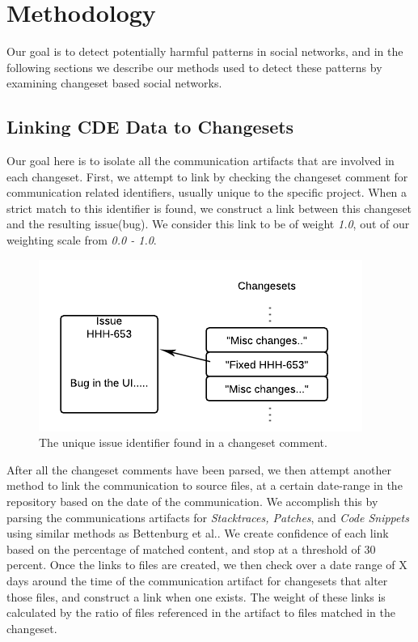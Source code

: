 \documentclass[conference]{IEEEtran}
\begin{document}
\section{Methodology}
Our goal is to detect potentially harmful patterns in social networks, and in the following sections we describe our methods used to detect these patterns by examining changeset based social networks.

\subsection{Linking CDE Data to Changesets}
Our goal here is to isolate all the communication artifacts that are involved in each changeset.  First, we attempt to link by checking the changeset comment for communication related identifiers, usually unique to the specific project.   When a strict match to this identifier is found, we construct a link between this changeset and the resulting issue(bug).  We consider this link to be of weight \textit{1.0}, out of our weighting scale from \textit{0.0 - 1.0}.  

\begin{figure}[h!]
\centering
\includegraphics[width=1.0\columnwidth]{CommitsToChangesets}
\caption{The unique issue identifier found in a changeset comment.\label{fig:identifier}}
\end{figure}

After all the changeset comments have been parsed, we then attempt another method to link the communication to source files, at a certain date-range in the repository based on the date of the communication.  We accomplish this by parsing the communications artifacts for \textit{Stacktraces, Patches}, and \textit{Code Snippets} using similar methods as Bettenburg et al.\cite{Bettenburg:2008:ESI:1370750.1370757}.  We create confidence of each link based on the percentage of matched content, and stop at a threshold of 30 percent.  Once the links to files are created, we then check over a date range of X days around the time of the communication artifact for changesets that alter those files, and construct a link when one exists.  The weight of these links is calculated by the ratio of files referenced in the artifact to files matched in the changeset.
\end{document}

